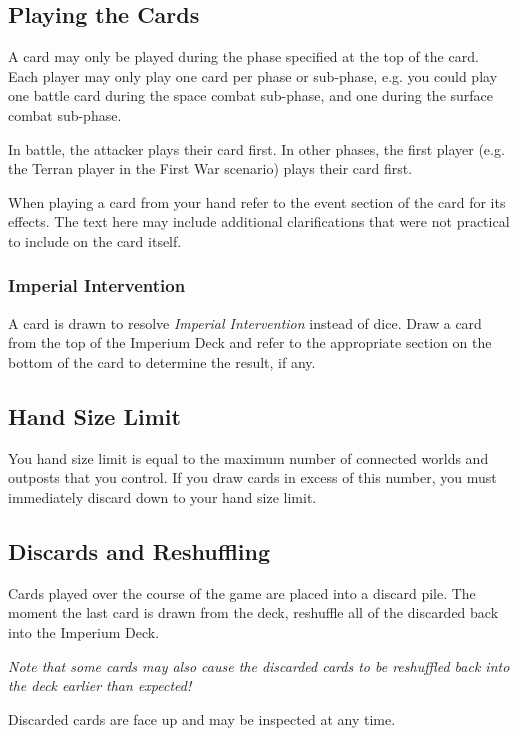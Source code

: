 \subsection{Playing the Cards}

A card may only be played during the phase specified at the top of the card. Each player may only play one card per phase or sub-phase, e.g. you could play one battle card during the space combat sub-phase, and one during the surface combat sub-phase.

In battle, the attacker plays their card first. In other phases, the first player (e.g. the Terran player in the First War scenario) plays their card first.

When playing a card from your hand refer to the event section of the card for its effects. The text here may include additional clarifications that were not practical to include on the card itself.

\subsubsection{Imperial Intervention}

A card is drawn to resolve \textit{Imperial Intervention} instead of dice. Draw a card from the top of the Imperium Deck and refer to the appropriate section on the bottom of the card to determine the result, if any.

\subsection{Hand Size Limit}

You hand size limit is equal to the maximum number of connected worlds and outposts that you control. If you draw cards in excess of this number, you must immediately discard down to your hand size limit.

\subsection{Discards and Reshuffling}

Cards played over the course of the game are placed into a discard pile. The moment the last card is drawn from the deck, reshuffle all of the discarded back into the Imperium Deck.

\textit{Note that some cards may also cause the discarded cards to be reshuffled back into the deck earlier than expected!}

Discarded cards are face up and may be inspected at any time.

